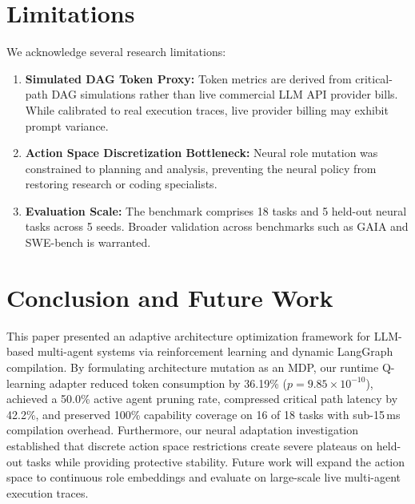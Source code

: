 \documentclass[conference]{IEEEtran}
\begin{document}
\section{Limitations}
\label{sec:limitations}

We acknowledge several research limitations:
\begin{enumerate}[leftmargin=*]
    \item \textbf{Simulated DAG Token Proxy:} Token metrics are derived from critical-path DAG simulations rather than live commercial LLM API provider bills. While calibrated to real execution traces, live provider billing may exhibit prompt variance.
    \item \textbf{Action Space Discretization Bottleneck:} Neural role mutation was constrained to planning and analysis, preventing the neural policy from restoring research or coding specialists.
    \item \textbf{Evaluation Scale:} The benchmark comprises 18 tasks and 5 held-out neural tasks across 5 seeds. Broader validation across benchmarks such as GAIA and SWE-bench is warranted.
\end{enumerate}

\section{Conclusion and Future Work}
\label{sec:conclusion}

This paper presented an adaptive architecture optimization framework for LLM-based multi-agent systems via reinforcement learning and dynamic LangGraph compilation. By formulating architecture mutation as an MDP, our runtime Q-learning adapter reduced token consumption by 36.19\% ($p = 9.85 \times 10^{-10}$), achieved a 50.0\% active agent pruning rate, compressed critical path latency by 42.2\%, and preserved 100\% capability coverage on 16 of 18 tasks with sub-15\,ms compilation overhead. Furthermore, our neural adaptation investigation established that discrete action space restrictions create severe plateaus on held-out tasks while providing protective stability. Future work will expand the action space to continuous role embeddings and evaluate on large-scale live multi-agent execution traces.



\end{document}
